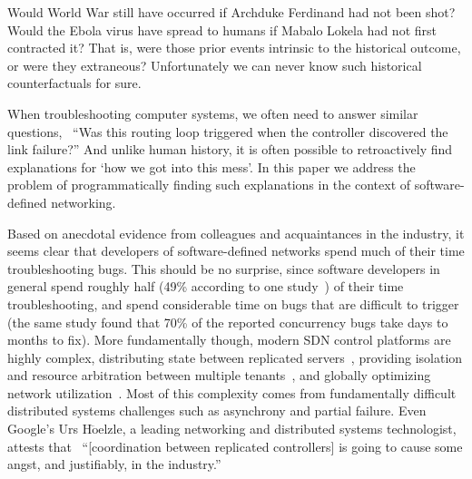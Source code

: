
Would World War  still have occurred if Archduke Ferdinand had not been
shot? Would the Ebola virus have spread to humans if Mabalo Lokela had not
first contracted it?
That is, were those prior events intrinsic to the
historical outcome, or
were they extraneous? Unfortunately we can never know such
historical counterfactuals for sure.

When troubleshooting computer systems, we often need to answer similar questions,
\eg~``Was this routing loop triggered when the controller discovered the link failure?''
And unlike human history, it is often possible to retroactively find explanations for
`how we got into this mess'. In this paper we address the problem of programmatically
finding such explanations in the context of software-defined networking.


Based on anecdotal evidence from colleagues and acquaintances in the industry, it seems clear that
developers of software-defined networks spend much of their time
troubleshooting bugs. This should be no surprise, since software developers in
general spend roughly half (49\% according to one
study~\cite{msoft_concurrency}) of their time troubleshooting, and spend
considerable time on bugs that are difficult to trigger
(the same study found that 70\% of the reported concurrency bugs
take days to months to fix).
More fundamentally though, modern SDN control platforms are highly complex,
distributing state between replicated
servers~\cite{floodlight},
providing isolation and resource arbitration between multiple
tenants~\cite{Casado:2010:VNF:1921151.1921162}, and
globally optimizing network utilization~\cite{urs}.
Most of this complexity comes from
fundamentally difficult distributed systems challenges such as asynchrony and
partial failure. Even Google's Urs H$\ddot{\mathrm{o}}$elzle, a leading
networking and distributed systems technologist,
attests that~\cite{urs} ``[coordination between replicated controllers] is going to
cause some angst, and justifiably, in the industry.''

